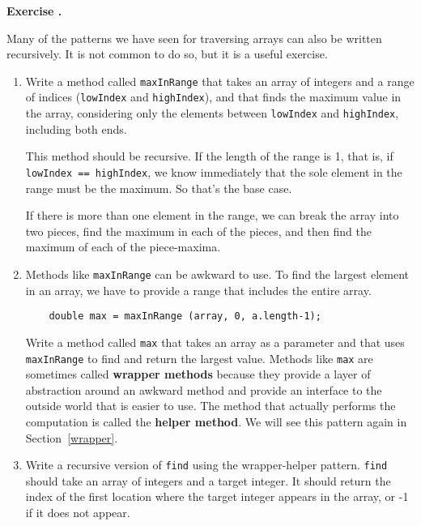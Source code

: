 \documentclass{book}
\newcounter{exercisenum}
\renewcommand{\theexercisenum}{{\thechapter}.\arabic{exercisenum}}
\newenvironment{exercisesize}{\begin{small}}{\end{small}}
\newcommand{\exerciseheader}[2]{                                          
     
  \begin{exercisesize}                                                    
     
     
  \def\theenumi{\alph{enumi}}                                             
  \def\labelenumi{\theenumi.}                                             
  \def\theenumii{\roman{enumii}}                                          
  \def\labelenumii{\theenumii.}                                           
  {\bf Exercise {#1}{#2}}\hspace{0.1in}                 
}
\newcommand{\startexercise}[1]{%
  \refstepcounter{exercisenum}                                            
  \exerciseheader{\theexercisenum}{#1}                                    
}
\newcommand{\stopexercise}{%
  {\hfill}                                                               
  \end{exercisesize}      
}
\newcommand{\normaldif}{}
\newenvironment{exercise}{\startexercise{\normaldif{}}}{\stopexercise}
\begin{document}
\begin{exercise}
Many of the patterns we have seen for traversing arrays can
also be written recursively.  It is not common to do so, but
it is a useful exercise.

\begin{enumerate}

\item Write a method called {\tt maxInRange} that takes an array of
integers and a range of indices ({\tt lowIndex} and {\tt highIndex}),
and that finds the maximum value in the array, considering only the
elements between {\tt lowIndex} and {\tt highIndex}, including both
ends.

This method should be recursive.  If the length of the range is 1,
that is, if {\tt lowIndex == highIndex}, we know immediately that the
sole element in the range must be the maximum.  So that's the base
case.

If there is more than one element in the range, we can break the array
into two pieces, find the maximum in each of the pieces, and then find
the maximum of each of the piece-maxima.

\item Methods like {\tt maxInRange} can be awkward to use.  To
find the largest element in an array, we have to provide a range
that includes the entire array.

\begin{verbatim}
    double max = maxInRange (array, 0, a.length-1);
\end{verbatim}

Write a method called {\tt max} that takes an array as a parameter
and that uses {\tt maxInRange} to find and return the largest value.
Methods like {\tt max} are sometimes called {\bf wrapper methods}
because they provide a layer of abstraction around an awkward method
and provide an interface to
the outside world that is easier to use.  The method that actually
performs the computation is called the {\bf helper method}.  We will
see this pattern again in Section~\ref{wrapper}.

\item Write a recursive version of {\tt find} using the
wrapper-helper pattern.  {\tt find} should take an array of
integers and a target integer.  It should return the index
of the first location where the target integer appears in the
array, or -1 if it does not appear.

\end{enumerate}
\end{exercise}
\end{document}
